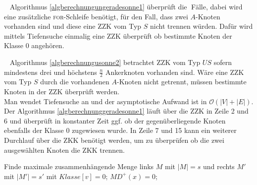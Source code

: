 \vspace{-2mm}
~\linebreak 
Algorithmus \ref{algberechnungungeradesonne1} überprüft die \grqq$\;$Fälle, dabei wird eine zusätzliche \textsc{for}-Schleife benötigt, für den Fall, dass zwei $A$-Knoten vorhanden sind und diese eine ZZK vom Typ $S$ nicht trennen würden. Dafür wird mittels Tiefensuche einmalig eine ZZK überprüft ob bestimmte Knoten der Klasse $0$ angehören.\\
\vspace{-2mm}
\begin{algorithm}
\caption{$US(x)$}
\begin{algorithmic}[1]
\ENDIF
\end{algorithmic}
\label{algberechnungusonne2}
\end{algorithm}
\vspace{-2mm}
~\linebreak
Algorithmus \ref{algberechnungusonne2} betrachtet ZZK vom Typ $US$ sofern mindestens drei und höchstens $\frac{n}{2}$ Ankerknoten vorhanden sind. Wäre eine ZZK vom Typ $S$ durch die vorhandenen $A$-Knoten nicht getrennt, müssen bestimmte Knoten in der ZZK überprüft werden.\\
Man wendet Tiefensuche an und der asymptotische Aufwand ist in $\mathcal{O}(|V|+|E|)$.\newpage
Der Algorithmus \ref{algberechnunggeradesonne1} läuft über die ZZK in Zeile 2 und 6 und überprüft in konstanter Zeit ggf. ob der gegenüberliegende Knoten ebenfalls der Klasse $0$ zugewiesen wurde. In Zeile 7 und 15 kann ein weiterer Durchlauf über die ZKK benötigt werden, um zu überprüfen ob die zwei ausgewählten Knoten die ZKK trennen.\newline
\vspace{-3mm}
\begin{algorithm}
\caption{$USG1(x)$}
\begin{algorithmic}[1]
\vspace{2mm} 
	\STATE Finde maximale zusammenhängende Menge links $M$ mit $|M|=s$ und rechts $M'$ mit $|M'|=s'$ mit 			$Klasse[v]=0$;
	\ENDIF
{} 
	\ENDIF 
{}  \STATE $MD^+(x)=0$;\ENDIF
\vspace{2mm}
\end{algorithmic}
\label{algberechnunggeradesonne1}
\end{algorithm}

